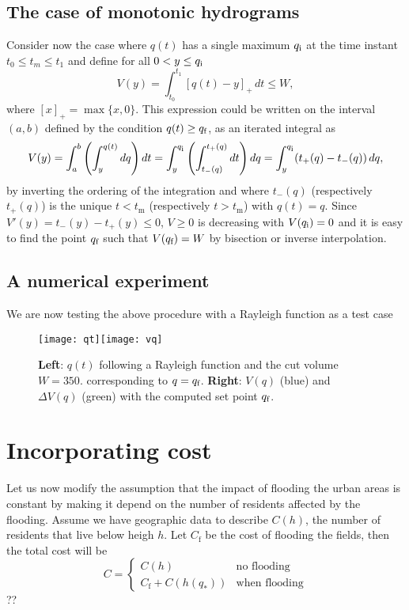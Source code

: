 \subsection{The case of monotonic hydrograms}

Consider now the case where $q(t)$ has a single maximum $q_{\mbox{\scriptsize i}}$ at the time instant $t_{0}\leq t_{m}\leq t_{1}$
and define for all $0<y\leq q_{\mbox{\scriptsize i}}$ \[
V(y)=\int_{t_{0}}^{t_{1}}\left[q(t)-y\right]_{+}\, dt\leq W,\]
where $\left[x\right]_{+}=\max\{x,0\}$. This expression could be
written on the interval $(a,b)$ defined by the condition $q(t)\geq q_{\mbox{\scriptsize f}}$,
as an iterated integral as\[
V(y)=\int_{a}^{b}\left(\int_{y}^{q(t)}dq\right)dt=\int_{y}^{q_{\mbox{\scriptsize i}}}\left(\int_{t_{-}(q)}^{t_{+}(q)}dt\right)dq=\int_{y}^{q_{\mbox{\scriptsize i}}}(t_{+}(q)-t_{-}(q))\, dq,\]
by inverting the ordering of the integration and where $t_{-}(q)$
(respectively $t_{+}(q)$) is the unique $t<t_{\mbox{m}}$ (respectively
$t>t_{\mbox{m}}$) with $q(t)=q$. Since $V'(y)=t_{-}(y)-t_{+}(y)\leq0$,
$V\geq0$ is decreasing with $V(q_{\mbox{\scriptsize i}})=0$ and it is easy to find the
point $q_{\mbox{\scriptsize f}}$ such that $V(q_{\mbox{\scriptsize f}})=W$ by bisection or inverse interpolation.


\subsection{A numerical experiment}

We are now testing the above procedure with a Rayleigh function as a test case


\begin{figure}
\texttt{[image: qt]}\hfill\texttt{[image: vq]}
\caption{\textbf{Left}: $q(t)$ following a Rayleigh function and the cut volume
$W=350.$ corresponding to $q=q_{\mbox{\scriptsize f}}$.\textbf{ Right}: $V(q)$ (blue)
and $\Delta V(q)$ (green) with the computed set point $q_{\mbox{\scriptsize f}}$. }
\end{figure}



\section{Incorporating cost}

Let us now modify the assumption that the impact of flooding the urban
areas is constant by making it depend on the number of residents affected
by the flooding. Assume we have geographic data to describe $C(h)$,
the number of residents that live below heigh $h$. Let $C_{\mbox{f}}$
be the cost of flooding the fields, then the total cost will be \[
C=\left\{ \begin{array}{cc}
C(h) & \mbox{no flooding}\\
C_{\mbox{f}}+C(h(q_{*})) & \mbox{when flooding}\end{array}\right.\]
?? 